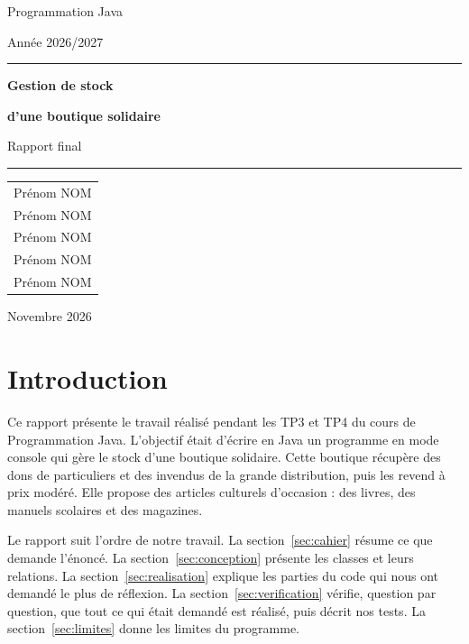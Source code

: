 \documentclass[11pt,a4paper]{article}
\begin{document}
\begin{titlepage}
\centering
{\large Programmation Java\par}
\vspace{0.3cm}
{\large Année 2026/2027\par}
\vfill
\rule{\textwidth}{0.6pt}\par
\vspace{0.7cm}
{\Huge\bfseries Gestion de stock\par}
\vspace{0.3cm}
{\Huge\bfseries d'une boutique solidaire\par}
\vspace{0.7cm}
{\Large Rapport final\par}
\vspace{0.7cm}
\rule{\textwidth}{0.6pt}\par
\vfill
{\large
\begin{tabular}{c}
Prénom NOM \\
Prénom NOM \\
Prénom NOM \\
Prénom NOM \\
Prénom NOM \\
\end{tabular}\par}
\vfill
{\large Novembre 2026\par}
\end{titlepage}

\tableofcontents
\newpage

\section{Introduction}

Ce rapport présente le travail réalisé pendant les TP3 et TP4 du cours de Programmation Java.
L'objectif était d'écrire en Java un programme en mode console qui gère le
stock d'une boutique solidaire. Cette boutique récupère des dons de particuliers et des invendus de
la grande distribution, puis les revend à prix modéré. Elle propose des articles culturels
d'occasion : des livres, des manuels scolaires et des magazines.

Le rapport suit l'ordre de notre travail. La section~\ref{sec:cahier} résume ce que demande
l'énoncé. La section~\ref{sec:conception} présente les classes et leurs relations. La
section~\ref{sec:realisation} explique les parties du code qui nous ont demandé le plus de
réflexion. La section~\ref{sec:verification} vérifie, question par question, que tout ce qui était
demandé est réalisé, puis décrit nos tests. La section~\ref{sec:limites} donne les limites du
programme.
\end{document}
